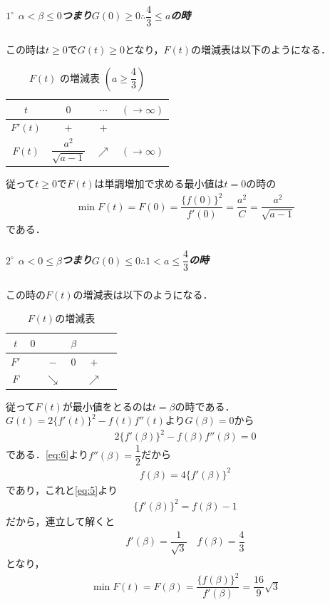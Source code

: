 \documentclass[../../main.tex]{subfiles}
\begin{document}
\subparagraph{$1^\circ$ $\alpha<\beta\le0$つまり$G(0)\ge 0 \therefore \dfrac{4}{3}\le a$の時}

この時は$t \ge 0$で$G(t) \ge 0$となり，$F(t)$の増減表は以下のようになる．

\begin{table}[htb]
  \centering
  \caption{$F(t)$ の増減表 $\left(a \ge \dfrac{4}{3}\right)$}
  \label{tab:Ft_case1}
  \renewcommand{\arraystretch}{1.5}
  \begin{tabular}{c|ccc}
    \hline
    $t$      & $0$                      & $\cdots$   & $(\to\infty)$ \\ \hline
    $F'(t)$  & $+$                      & $+$        &               \\ \hline
    $F(t)$   & $\dfrac{a^2}{\sqrt{a-1}}$ & $\nearrow$ & $(\to\infty)$ \\ \hline
  \end{tabular}
\end{table}

従って$t\ge0$で$F(t)$は単調増加で求める最小値は$t=0$の時の
\begin{align}
  \min F(t)=F(0)=\dfrac{\{f(0)\}^2}{f'(0)} = \dfrac{a^2}{C} = \dfrac{a^2}{\sqrt{a-1}}
\end{align}
である．

\subparagraph{$2^\circ$ $\alpha<0\le\beta$つまり$G(0) \le 0 \therefore 1<a\le\dfrac{4}{3}$の時}

この時の$F(t)$の増減表は以下のようになる．

\begin{table}[htb]
  \centering
  \caption{$F(t)$の増減表}
  \begin{tabular}{c|ccccc}
    $t$ & $0$ & & $\beta$ & & \\
    \hline
    $F'$ & & $-$ & $0$ & $+$ & \\
    \hline
    $F$ & & $\searrow$ & & $\nearrow$ &
  \end{tabular}
\end{table}

従って$F(t)$が最小値をとるのは$t=\beta$の時である．$G(t)=2\{f'(t)\}^2-f(t)f''(t)$より$G(\beta)=0$から
\begin{align}
  2\{f'(\beta)\}^2-f(\beta)f''(\beta) = 0
\end{align}
である．\cref{eq:6}より$f''(\beta)=\dfrac{1}{2}$だから
\begin{align}
  f(\beta) = 4\{f'(\beta)\}^2
\end{align}
であり，これと\cref{eq:5}より
\begin{align}
  \{f'(\beta)\}^2 = f(\beta)-1
\end{align}
だから，連立して解くと
\begin{align}
  f'(\beta) = \dfrac{1}{\sqrt{3}}\quad f(\beta) = \dfrac{4}{3}
\end{align}
となり，
\begin{align}
  \min F(t)=F(\beta)= \dfrac{\{f(\beta)\}^2}{f'(\beta)} = \dfrac{16}{9}\sqrt{3}
\end{align}
\casesend
\end{document}
